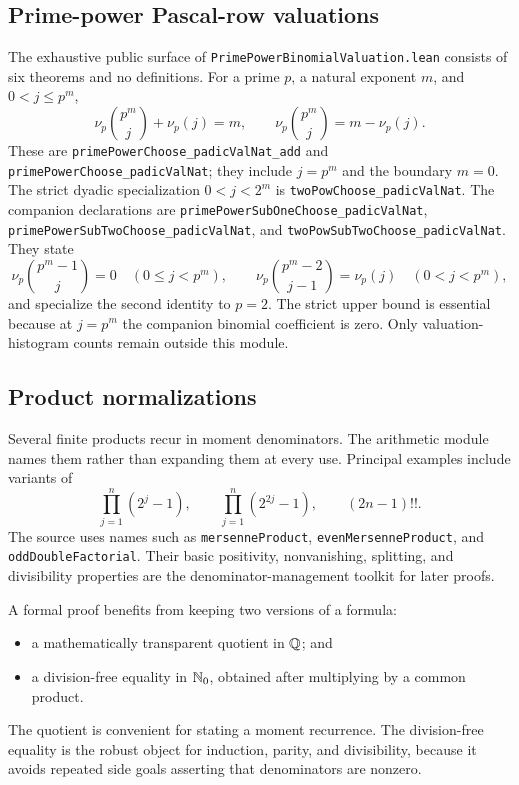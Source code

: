 \documentclass[11pt,oneside]{article}
\theoremstyle{definition}
\theoremstyle{remark}
\begin{document}
\subsection{Prime-power Pascal-row valuations}
The exhaustive public surface of \nolinkurl{PrimePowerBinomialValuation.lean}
consists of six theorems and no definitions.  For a prime \(p\), a natural exponent \(m\), and
\(0<j\leq p^m\),
\[
  \nu_p\!\binom{p^m}{j}+\nu_p(j)=m,
  \qquad
  \nu_p\!\binom{p^m}{j}=m-\nu_p(j).
\]
These are \nolinkurl{primePowerChoose_padicValNat_add} and
\nolinkurl{primePowerChoose_padicValNat}; they include \(j=p^m\) and the
boundary \(m=0\).  The strict dyadic specialization \(0<j<2^m\) is
\nolinkurl{twoPowChoose_padicValNat}.  The companion declarations are
\nolinkurl{primePowerSubOneChoose_padicValNat},
\nolinkurl{primePowerSubTwoChoose_padicValNat}, and
\nolinkurl{twoPowSubTwoChoose_padicValNat}.  They state
\[
 \nu_p\!\binom{p^m-1}{j}=0\quad(0\le j<p^m),
 \qquad
 \nu_p\!\binom{p^m-2}{j-1}=\nu_p(j)\quad(0<j<p^m),
\]
and specialize the second identity to \(p=2\).  The strict upper bound is
essential because at \(j=p^m\) the companion binomial coefficient is zero.
Only valuation-histogram counts remain outside this module.

\subsection{Product normalizations}
Several finite products recur in moment denominators.  The arithmetic module names them rather than expanding them at every use.  Principal examples include variants of
\[
  \prod_{j=1}^{n}(2^j-1),
  \qquad
  \prod_{j=1}^{n}(2^{2j}-1),
  \qquad
  (2n-1)!!.
\]
The source uses names such as \nolinkurl{mersenneProduct}, \nolinkurl{evenMersenneProduct}, and \nolinkurl{oddDoubleFactorial}.  Their basic positivity, nonvanishing, splitting, and divisibility properties are the denominator-management toolkit for later proofs.

A formal proof benefits from keeping two versions of a formula:
\begin{itemize}
  \item a mathematically transparent quotient in \(\mathbb{Q}\); and
  \item a division-free equality in \(\mathbb{N}_{0}\), obtained after multiplying by a common product.
\end{itemize}
The quotient is convenient for stating a moment recurrence.  The division-free equality is the robust object for induction, parity, and divisibility, because it avoids repeated side goals asserting that denominators are nonzero.
\end{document}
